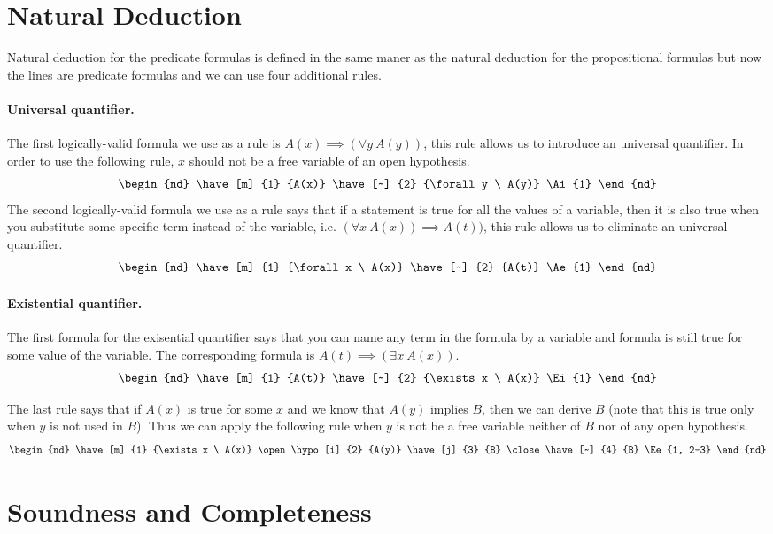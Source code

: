 \section{Natural Deduction}
Natural deduction for the predicate formulas is defined in the same maner as
the natural deduction for the propositional formulas but now the lines are
predicate formulas and we can use four additional rules.

\paragraph{Universal quantifier.}
The first logically-valid formula we use as a rule is $A(x) \implies (\forall y
\ A(y))$, this rule allows us to introduce an universal quantifier.
In order to use the following rule, $x$ should not be a free variable of
an open hypothesis.
\[
  \begin{nd}
    \have [m] {1} {A(x)}
    \have [~] {2} {\forall y \  A(y)} \Ai{1}
  \end{nd}
\]
The second logically-valid formula we use as a rule says that if a statement is
true for all the values of a variable, then it is also true when you substitute
some specific term instead of the variable, i.e. $(\forall x \ A(x)) \implies
A(t))$, this rule allows us to eliminate an universal quantifier.
\[
  \begin{nd}
    \have [m] {1} {\forall x \  A(x)}
    \have [~] {2} {A(t)} \Ae{1}
  \end{nd}
\]

\paragraph{Existential quantifier.}
The first formula for the exisential quantifier says that you can name any term
in the formula by a variable and formula is still true for some value of the
variable. The corresponding formula is $A(t) \implies (\exists x \ A(x))$.
\[
  \begin{nd}
    \have [m] {1} {A(t)}
    \have [~] {2} {\exists x \ A(x)} \Ei{1}
  \end{nd}
\]

The last rule says that if $A(x)$ is true for some $x$ and we know that $A(y)$
implies $B$, then we can derive $B$ (note that this is true only when
$y$ is not used in $B$). Thus we can apply the following rule when $y$ is not
be a free variable neither of $B$ nor of any open hypothesis.
\[
  \begin{nd}
    \have [m] {1} {\exists x \ A(x)}
    \open
      \hypo [i] {2} {A(y)}
      \have[j] {3} {B}
    \close
    \have [~] {4} {B} \Ee{1, 2-3}
  \end{nd}
\]
\section{Soundness and Completeness}
